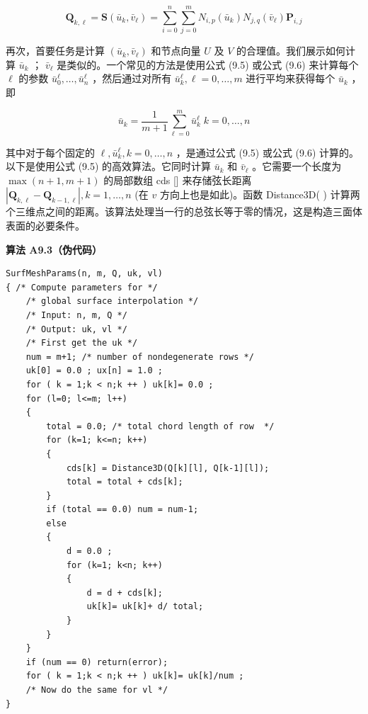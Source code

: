 \documentclass[../main.tex]{subfiles}
\begin{document}
\[
{\mathbf{Q}}_{k,\ell } = \mathbf{S}\left( {{\bar{u}}_{k},{\bar{v}}_{\ell }}\right)  = \mathop{\sum }\limits_{{i = 0}}^{n}\mathop{\sum }\limits_{{j = 0}}^{m}{N}_{i,p}\left( {\bar{u}}_{k}\right) {N}_{j,q}\left( {\bar{v}}_{\ell }\right) {\mathbf{P}}_{i,j} \tag{9.25}
\]

再次，首要任务是计算 \(\left( {{\bar{u}}_{k},{\bar{v}}_{\ell }}\right)\) 和节点向量 \(U\) 及 \(V\) 的合理值。我们展示如何计算 \({\bar{u}}_{k}\) ； \({\bar{v}}_{\ell }\) 是类似的。一个常见的方法是使用公式 (9.5) 或公式 (9.6) 来计算每个 \(\ell\) 的参数 \({\bar{u}}_{0}^{\ell },\ldots ,{\bar{u}}_{n}^{\ell }\) ，然后通过对所有 \({\bar{u}}_{k}^{\ell },\ell  = 0,\ldots ,m\) 进行平均来获得每个 \({\bar{u}}_{k}\) ，即

\[
{\bar{u}}_{k} = \frac{1}{m + 1}\mathop{\sum }\limits_{{\ell  = 0}}^{m}{\bar{u}}_{k}^{\ell }\;k = 0,\ldots ,n
\]

其中对于每个固定的 \(\ell ,{\bar{u}}_{k}^{\ell },k = 0,\ldots ,n\) ，是通过公式 (9.5) 或公式 (9.6) 计算的。以下是使用公式 (9.5) 的高效算法。它同时计算 \({\bar{u}}_{k}\) 和 \({\bar{v}}_{\ell }\) 。它需要一个长度为 \(\max \left( {n + 1,m + 1}\right)\) 的局部数组 cds [] 来存储弦长距离 \(\left| {{\mathbf{Q}}_{k,\ell } - {\mathbf{Q}}_{k - 1,\ell }}\right| ,k = 1,\ldots ,n\) (在 \(v\) 方向上也是如此)。函数 Distance3D( ) 计算两个三维点之间的距离。该算法处理当一行的总弦长等于零的情况，这是构造三面体表面的必要条件。

\par\medskip\noindent\textbf{算法 A9.3（伪代码）}\par
\begin{verbatim}
SurfMeshParams(n, m, Q, uk, vl)
{ /* Compute parameters for */
    /* global surface interpolation */
    /* Input: n, m, Q */
    /* Output: uk, vl */
    /* First get the uk */
    num = m+1; /* number of nondegenerate rows */
    uk[0] = 0.0 ; ux[n] = 1.0 ;
    for ( k = 1;k < n;k ++ ) uk[k]= 0.0 ;
    for (l=0; l<=m; l++)
    {
        total = 0.0; /* total chord length of row  */
        for (k=1; k<=n; k++)
        {
            cds[k] = Distance3D(Q[k][l], Q[k-1][l]);
            total = total + cds[k];
        }
        if (total == 0.0) num = num-1;
        else
        {
            d = 0.0 ;
            for (k=1; k<n; k++)
            {
                d = d + cds[k];
                uk[k]= uk[k]+ d/ total;
            }
        }
    }
    if (num == 0) return(error);
    for ( k = 1;k < n;k ++ ) uk[k]= uk[k]/num ;
    /* Now do the same for vl */
}
\end{verbatim}
\end{document}
